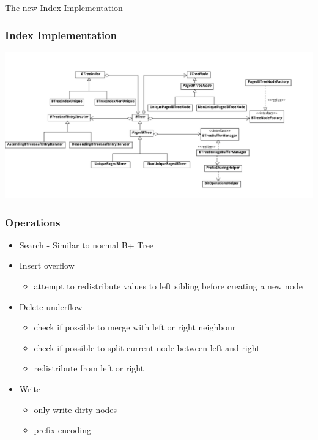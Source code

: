\documentclass{beamer}
\begin{document}
  \begin{section}{The new Index Implementation}
    \begin{frame}
        \frametitle{Index Implementation}
        \includegraphics[scale=0.065]{ZooDBClassDiagram} 
    \end{frame}

    \begin{frame}
        \frametitle{Operations}
        \begin{itemize}
        \item Search - Similar to normal B+ Tree
        \pause
        \item Insert overflow
            \begin{itemize}
            \item attempt to redistribute values to left sibling before creating a new node
            \end{itemize}
        \pause
        \item Delete underflow
            \begin{itemize}
            \item check if possible to merge with left or right neighbour
            \item check if possible to split current node between left and right
            \item redistribute from left or right
            \end{itemize}
        \pause
        \item Write
            \begin{itemize}
              \item only write dirty nodes
              \item prefix encoding
            \end{itemize}
        \end{itemize}
    \end{frame}
  \end{section}
\end{document}
